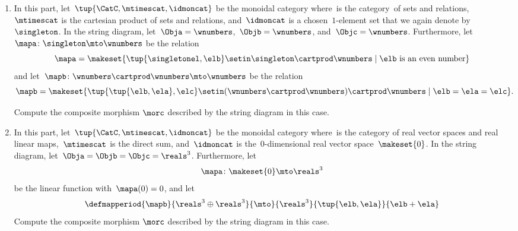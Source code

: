 {\begin{gradedexercise}
\begin{enumerate}
        \item In this part, let~$\tup{\CatC,\mtimescat,\idmoncat}$ be the monoidal category where~\CatC is the category~\Rel of sets and relations,~$\mtimescat$ is the cartesian product of sets and relations, and~$\idmoncat$ is a chosen~$1$-element set that we again denote by~$\singleton$.
              In the string diagram, let~$\Obja = \wnumbers$,~$\Objb = \wnumbers$, and~$\Objc = \wnumbers$.
              Furthermore, let~$\mapa\colon \singleton \mto \wnumbers$ be the relation
              \begin{equation}
                  \mapa = \makeset{ \tup{\singletonel, \elb} \setin \singleton \cartprod \wnumbers \mid \elb \text{ is an even number}}
              \end{equation}
              and let~$\mapb \colon \wnumbers \cartprod \wnumbers \mto \wnumbers$ be the relation
              \begin{equation}
                  \mapb = \makeset{ \tup{\tup{\elb, \ela}, \elc} \setin (\wnumbers \cartprod \wnumbers) \cartprod \wnumbers \mid \elb = \ela = \elc}.
              \end{equation}

              Compute the composite morphism $\morc$ described by the string diagram in this case.

        \item In this part, let~$\tup{\CatC,\mtimescat,\idmoncat}$ be the monoidal category where~\CatC is the category of real vector spaces and real linear maps,~$\mtimescat$ is the direct sum, and~$\idmoncat$ is the~$0$-dimensional real vector space~$\makeset{0}$.
              In the string diagram, let~$\Obja = \Objb = \Objc = \reals^3$.
              Furthermore, let
              \begin{equation}
                  \mapa\colon \makeset{0} \mto \reals^3
              \end{equation}
              be the linear function with~$\mapa(0) = 0$, and let
              \begin{equation}
                  \defmapperiod{\mapb}{\reals^3\oplus \reals^3}{\mto}{\reals^3}{\tup{\elb,\ela}}{\elb+\ela}
              \end{equation}
              Compute the composite morphism $\morc$ described by the string diagram in this case.
    \end{enumerate}
\end{gradedexercise}

}

